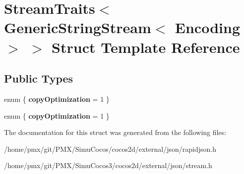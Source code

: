 \hypertarget{structStreamTraits_3_01GenericStringStream_3_01Encoding_01_4_01_4}{}\section{Stream\+Traits$<$ Generic\+String\+Stream$<$ Encoding $>$ $>$ Struct Template Reference}
\label{structStreamTraits_3_01GenericStringStream_3_01Encoding_01_4_01_4}
\subsection*{Public Types}
\begin{DoxyCompactItemize}
\item 
\mbox{\label{structStreamTraits_3_01GenericStringStream_3_01Encoding_01_4_01_4_a3dac31ea0d5d48fdf965f5c12e65b5f2}} 
enum \{ {\bfseries copy\+Optimization} = 1
 \}
\item 
\mbox{\label{structStreamTraits_3_01GenericStringStream_3_01Encoding_01_4_01_4_a5188d31a06f0395fe62381bd7cb195c0}} 
enum \{ {\bfseries copy\+Optimization} = 1
 \}
\end{DoxyCompactItemize}


The documentation for this struct was generated from the following files\+:\begin{DoxyCompactItemize}
\item 
/home/pmx/git/\+P\+M\+X/\+Simu\+Cocos/cocos2d/external/json/rapidjson.\+h\item 
/home/pmx/git/\+P\+M\+X/\+Simu\+Cocos3/cocos2d/external/json/stream.\+h\end{DoxyCompactItemize}
